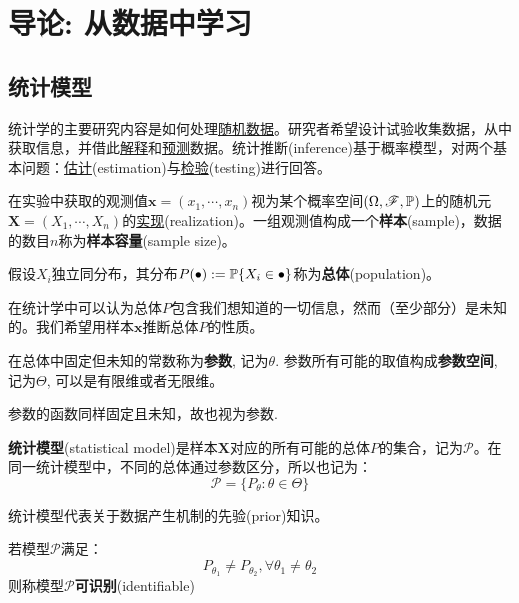 \chapter{导论: 从数据中学习}\label{ch:intro}

\section{统计模型}\label{sec:inference}

统计学的主要研究内容是如何处理\underline{随机数据}。研究者希望设计试验收集数据，从中获取信息，并借此\underline{解释}和\underline{预测}数据。统计推断(inference)基于概率模型，对两个基本问题：\underline{估计}(estimation)与\underline{检验}(testing)进行回答。

\begin{definition}[样本]
      在实验中获取的观测值$\mathbf{x}=(x_1, \cdots ,x_n)$视为某个概率空间$(\Omega,\mathscr{F},\P)$上的随机元$\mathbf{X}=(X_1,\cdots ,X_n)$的\underline{实现}(realization)。一组观测值构成一个\textbf{样本}(sample)，数据的数目$n$称为\textbf{样本容量}(sample size)。
\end{definition}

\begin{definition}[总体]
      假设$X_i$独立同分布，其分布$P(\bullet):=\P\{X_i \in \bullet\}$称为\textbf{总体}(population)。
\end{definition}

在统计学中可以认为总体$P$包含我们想知道的一切信息，然而（至少部分）是未知的。我们希望用样本$\mathbf{x}$推断总体$P$的性质。

\begin{definition}[参数]
      在总体中固定但未知的常数称为\textbf{参数}, 记为$\theta$. 参数所有可能的取值构成\textbf{参数空间}, 记为$\Theta$, 可以是有限维或者无限维。
\end{definition}
\begin{remark}
      参数的函数同样固定且未知，故也视为参数. 
\end{remark}

\begin{definition}[统计模型]
      \textbf{统计模型}(statistical model)是样本$\mathbf{X}$对应的所有可能的总体$P$的集合，记为$\mathcal{P}$。在同一统计模型中，不同的总体通过参数区分，所以也记为：
      \[ \mathcal{P}=\{ P_{\theta}:\theta \in \Theta \} \]
\end{definition}

统计模型代表关于数据产生机制的先验(prior)知识。

\begin{definition}[可识别]
      若模型$\mathcal{P}$满足：
      \[ P_{\theta_1} \neq P_{\theta_2}, \forall \theta_1 \neq \theta_2 \]
      则称模型$\mathcal{P}$\textbf{可识别}(identifiable)
\end{definition}

